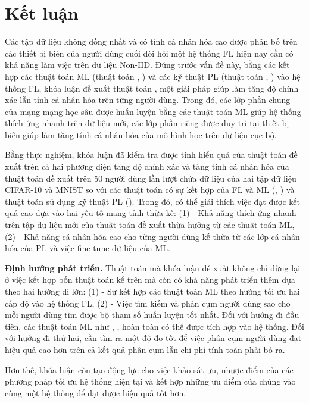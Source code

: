 \chapter{Kết luận}
\label{Chapter6}

Các tập dữ liệu không đồng nhất và có tính cá nhân hóa cao được phân bố trên các thiết bị biên của người dùng cuối đòi hỏi một hệ thống FL hiện nay cần có khả năng làm việc trên dữ liệu Non-IID. Đứng trước vấn đề này, bằng các kết hợp các thuật toán ML (thuật toán , ) và các kỹ thuật PL (thuật toán , ) vào hệ thống FL, khóa luận đề xuất thuật toán , một giải pháp giúp làm tăng độ chính xác lẫn tính cá nhân hóa trên từng người dùng. Trong đó, các lớp phần chung của mạng mạng học sâu được huấn luyện bằng các thuật toán ML giúp hệ thống thích ứng nhanh trên dữ liệu mới, các lớp phần riêng được duy trì tại thiết bị biên giúp làm tăng tính cá nhân hóa của mô hình học trên dữ liệu cục bộ.

Bằng thực nghiệm, khóa luận đã kiểm tra được tính hiểu quả của thuật toán đề xuất trên cả hai phương diện tăng độ chính xác và tăng tính cá nhân hóa của thuật toán đề xuất trên 50 người dùng lần lượt chứa dữ liệu của hai tập dữ liệu CIFAR-10 và MNIST so với các thuật toán có sự kết hợp của FL và ML (, ) và thuật toán sử dụng kỹ thuật PL (). Trong đó, có thể giải thích việc đạt được kết quả cao dựa vào hai yếu tố mang tính thừa kế: (1) - Khả năng thích ứng nhanh trên tập dữ liệu mới của thuật toán đề xuất thừa hưởng từ các thuật toán ML, (2) - Khả năng cá nhân hóa cao cho từng người dùng kế thừa từ các lớp cá nhân hóa của PL và việc fine-tune dữ liệu của ML.

\textbf{Định hướng phát triển.} Thuật toán mà khóa luận đề xuất không chỉ dừng lại ở việc kết hợp bốn thuật toán kể trên mà còn có khả năng phát triển thêm dựa theo hai hướng đi lớn: (1) - Sự kết hợp các thuật toán ML theo hướng tối ưu hai cấp độ vào hệ thống FL, (2) - Việc tìm kiếm và phân cụm người dùng sao cho mỗi người dùng tìm được bộ tham số huấn luyện tốt nhất. Đối với hướng đi đầu tiên, các thuật toán ML như  \cite{finn2017model},  \cite{nichol2018first},  \cite{rajeswaran2019meta} hoàn toàn có thể được tích hợp vào hệ thống. Đối với hướng đi thứ hai, cần tìm ra một độ đo tốt để việc phân cụm người dùng đạt hiệu quả cao hơn trên cả kết quả phân cụm lẫn chi phí tính toán phải bỏ ra.

Hơn thế, khóa luận còn tạo động lực cho việc khảo sát ưu, nhược điểm của các phương pháp tối ưu hệ thống hiện tại và kết hợp những ưu điểm của chúng vào cùng một hệ thống để đạt được hiệu quả tốt hơn.
